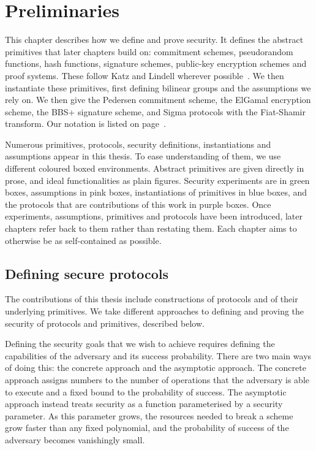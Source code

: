 \chapter{Preliminaries}\label{chap:preliminaries}

This chapter describes how we define and prove security.
It defines the abstract primitives that later chapters build
on: commitment schemes, pseudorandom functions, hash functions, signature
schemes, public-key encryption schemes and proof systems. These follow Katz
and Lindell wherever possible~\cite{KatLin14b}. We then instantiate these
primitives, first defining bilinear groups and the assumptions we rely on. We
then give the Pedersen commitment scheme, the ElGamal encryption scheme, the
BBS+ signature scheme, and Sigma protocols with the Fiat-Shamir transform. Our
notation is listed on page~\pageref{sec:notation}.

Numerous primitives, protocols, security definitions, instantiations and
assumptions appear in this thesis. To ease understanding of them, we use
different coloured boxed environments. Abstract primitives are given directly in
prose, and ideal functionalities as plain figures. Security experiments are in
green boxes, assumptions in pink boxes, instantiations of primitives in blue
boxes, and the protocols that are contributions of this work in purple boxes.
Once experiments, assumptions, primitives and protocols have been introduced,
later chapters refer back to them rather than restating them. Each chapter aims
to otherwise be as self-contained as possible.

\section{Defining secure protocols}\label{sec:prelims-security}

The contributions of this thesis include constructions of protocols and of their
underlying primitives. We take different approaches to defining and proving the
security of protocols and primitives, described below.

Defining the security goals that we wish to achieve requires defining the
capabilities of the adversary and its success probability. There are two main ways of doing this: the concrete approach and
the asymptotic approach. The concrete approach assigns numbers to the number of
operations that the adversary is able to execute and a fixed bound to the
probability of success. The asymptotic approach instead treats security as a
function parameterised by a security parameter. As this parameter grows, the
resources needed to break a scheme grow faster than any fixed polynomial, and
the probability of success of the adversary becomes vanishingly small.

